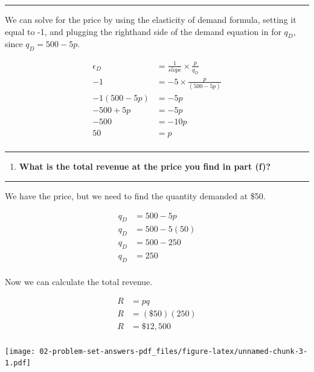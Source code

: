 \documentclass[
  11pt,
]{article}
\providecommand{\tightlist}{%
  \setlength{\itemsep}{0pt}\setlength{\parskip}{0pt}}
\begin{document}
\begin{center}\rule{0.5\linewidth}{0.5pt}\end{center}

We can solve for the price by using the elasticity of demand formula,
setting it equal to -1, and plugging the righthand side of the demand
equation in for \(q_D\), since \(q_D=500-5p\).

\[\begin{aligned}
    \epsilon_D &= \frac{1}{slope} \times \frac{p}{q_D}\\ 
    -1 &= -5 \times \frac{p}{(500-5p)}\\
    -1(500-5p)&=-5p\\   
    -500+5p&=-5p\\
    -500&=-10p\\
    50&=p\\
    \end{aligned}\]

\begin{center}\rule{0.5\linewidth}{0.5pt}\end{center}

\begin{enumerate}
\def\labelenumi{\alph{enumi}.}
\setcounter{enumi}{6}
\tightlist
\item
  \textbf{What is the total revenue at the price you find in part (f)?}
\end{enumerate}

\begin{center}\rule{0.5\linewidth}{0.5pt}\end{center}

We have the price, but we need to find the quantity demanded at \$50.

\[\begin{aligned}
    q_D &= 500-5p\\
    q_D&=500-5(50)\\
    q_D&=500-250\\
    q_D& = 250  \\
    \end{aligned}\]

Now we can calculate the total revenue.

\[\begin{aligned}
    R&=pq   \\
    R&=(\$50)(250)\\
    R&=\$12,500 \\
    \end{aligned}\]

\texttt{[image: 02-problem-set-answers-pdf\_files/figure-latex/unnamed-chunk-3-1.pdf]}
\end{document}
